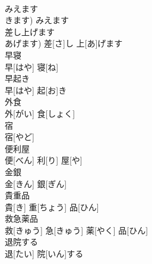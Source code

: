 \documentclass[8pt]{extreport}
\begin{document}
\begin{CJK}{UTF8}{min}
\\	みえます	
\\	きます)	みえます		
\\	差し上げます	
\\	あげます)	差[さ]し 上[あ]げます		
\\	早寝	
\\	早[はや] 寝[ね]		
\\	早起き	
\\	早[はや] 起[お]き		
\\	外食	
\\	外[がい] 食[しょく]		
\\	宿	
\\	宿[やど]		
\\	便利屋	
\\	便[べん] 利[り] 屋[や]		
\\	金銀	
\\	金[きん] 銀[ぎん]		
\\	貴重品	
\\	貴[き] 重[ちょう] 品[ひん]		
\\	救急薬品	
\\	救[きゅう] 急[きゅう] 薬[やく] 品[ひん]		
\\	退院する	
\\	退[たい] 院[いん]する		
\end{CJK}
\end{document}
